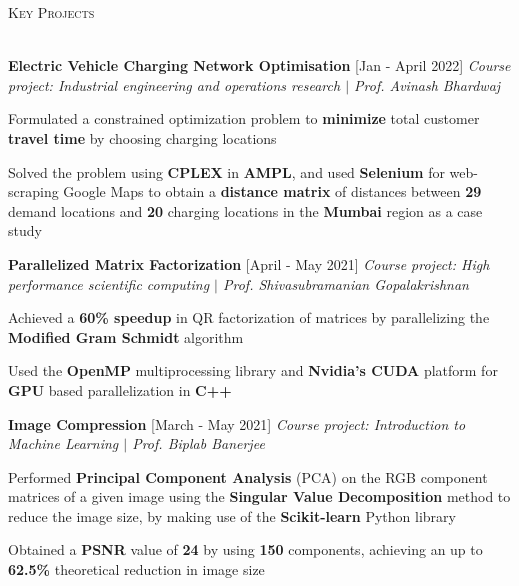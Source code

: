 \documentclass[10pt]{article}
\renewcommand{\section}[1]{
    \vspace*{5pt}
    \textsc{\Large{#1}}
    \vspace*{-8pt} \\ \hspace*{-5pt} 
    \hrulefill \\
    \vspace*{-15pt}
    \vspace*{-5pt}
}
\newcommand{\smallbullet}{
    \small$\bullet$
}
\newcommand{\bigblock}[3]{
    {
        \vspace*{3pt}
        \hspace*{-7pt} {\large{\textbf{#1}}} \hfill #2 \newline
        \textit{\textsf{#3}}
    }
}
\newenvironment{bullet-list-minor}{
    \begin{list}{
        \smallbullet
    }{
        \setlength\leftmargin{15pt}\topsep -6pt \itemsep -5pt
    }
} {
    \end{list}
}
\begin{document}

    \section{Key Projects}

    \bigblock{
        Electric Vehicle Charging Network Optimisation
    }{
        [Jan - April 2022]
    }{
        Course project: Industrial engineering and operations research \(|\) Prof. Avinash Bhardwaj
    }
	\begin{bullet-list-minor}
        \item Formulated a constrained optimization problem to \textbf{minimize} total customer \textbf{travel time} by choosing charging locations
        \item Solved the problem using \textbf{CPLEX} in \textbf{AMPL}, and used \textbf{Selenium} for web-scraping Google Maps to obtain a \textbf{distance matrix} of distances between \textbf{29} demand locations and \textbf{20} charging locations in the \textbf{Mumbai} region as a case study
    \end{bullet-list-minor}

    \bigblock{
        Parallelized Matrix Factorization
    }{
        [April - May 2021]
    }{
        Course project: High performance scientific computing \(|\) Prof. Shivasubramanian Gopalakrishnan
    }
	\begin{bullet-list-minor}
        \item Achieved a \textbf{60\% speedup} in QR factorization of matrices by parallelizing the \textbf{Modified Gram Schmidt} algorithm
        \item Used the \textbf{OpenMP} multiprocessing library and \textbf{Nvidia's CUDA} platform for \textbf{GPU} based parallelization in \textbf{C++}
    \end{bullet-list-minor}

    \bigblock{
        Image Compression
    }{
        [March - May 2021]
    }{
        Course project: Introduction to Machine Learning \(|\) Prof. Biplab Banerjee
    }
	\begin{bullet-list-minor}
        \item Performed \textbf{Principal Component Analysis} (PCA) on the RGB component matrices of a given image using the \textbf{Singular Value Decomposition} method to reduce the image size, by making use of the \textbf{Scikit-learn} Python library
        \item Obtained a \textbf{PSNR} value of \textbf{24} by using \textbf{150} components, achieving an up to \textbf{62.5\%} theoretical reduction in image size
    \end{bullet-list-minor}
\end{document}
